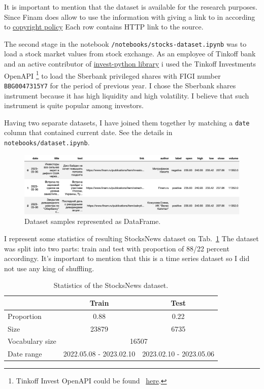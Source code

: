 \documentclass{article}
\begin{document}
It is important to mention that the dataset is available for the research purposes. 
Since Finam does allow to use the information with giving a link to in according to \href{https://www.finam.ru/about/copyright/}{copyright policy}
Each row contains HTTP link to the source.

The second stage in the notebook \texttt{/notebooks/stocks-dataset.ipynb} was to load a stock market values from stock exchange. 
As an employee of Tinkoff bank and an active contributor of \href{https://github.com/Tinkoff/invest-python}{invest-python library} i used the Tinkoff Investments OpenAPI \footnote{Tinkoff Invest OpenAPI could be found ~\href{https://www.tinkoff.ru/invest/open-api/}{here}.} to load the Sberbank privileged shares with FIGI number \texttt{BBG0047315Y7} for the period of previous year. I chose the Sberbank shares instrument because it has high liquidity and high volatility. I believe that such instrument is quite popular among investors.

Having two separate datasets, I have joined them together by matching a \texttt{date} column that contained current date. 
See the details in \texttt{notebooks/dataset.ipynb}.

\begin{figure}[!tbh]
    \centering
    \includegraphics[width=0.9\linewidth]{dataset.png}
    \caption{Dataset samples represented as DataFrame.}
    \label{datased}
\end{figure}

I represent some statistics of resulting StocksNews dataset on Tab.~\ref{tab:statistics} The dataset was split into two parts: train and test with proportion of 88/22 percent accordingy. It's important to mention that this is a time series dataset so I did not use any king of shuffling. 

\begin{table}[tbh!]
\begin{center}
\begin{tabular}[t]{|l|cc|}
\hline
 & Train & Test \\
\hline
Proportion & 0.88 & 0.22  \\
Size & 23879 & 6735 \\
Vocabulary size & \multicolumn{2}{c|}{16507} \\
Date range & 2022.05.08 - 2023.02.10 & 2023.02.10 - 2023.05.06 \\

\hline
\end{tabular}
\caption{Statistics of the StocksNews dataset.}
\label{tab:statistics}
\end{center}
\end{table}
\end{document}
